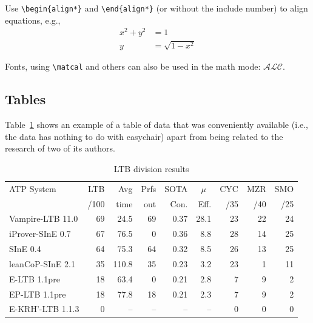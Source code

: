 \documentclass{imav2013}
\newcommand{\easychair}{\textsf{easychair}}
\begin{document}
Use {\tt \verb|\|begin\{align*\}} and {\tt \verb|\|end\{align*\}} (or without
the {\tt *} include number) to align equations, e.g.,
\begin{align*}
x^2 + y^2 &= 1 \\
y &= \sqrt{1 - x^2}
\end{align*}

Fonts, using \verb|\matcal| and others can also be used in the math mode: $\mathcal{ALC}$.

\subsection{Tables}
\label{sect:tables}

Table~\ref{tab:ltbexample} shows an example of a table of data that was
conveniently available (i.e., the data has nothing to do with
{\easychair}) apart from being related to the research of two of its
authors. 

\begin{table}[htp]
	\begin{centering}
		\begin{tabular}{lrrrrrrrr}
		\hline
		ATP System            & LTB & Avg  &Prfs & SOTA & \multicolumn{1}{c}{$\mu$} & CYC & MZR & SMO \\
		                      & /100& time & out & Con. & Eff. & /35 & /40 & /25 \\
		\hline
		Vampire-LTB 11.0      &  69 & 24.5 &  69 & 0.37 & 28.1 &  23 &  22 &  24 \\
		iProver-SInE 0.7      &  67 & 76.5 &   0 & 0.36 &  8.8 &  28 &  14 &  25 \\
		SInE 0.4              &  64 & 75.3 &  64 & 0.32 &  8.5 &  26 &  13 &  25 \\
		leanCoP-SInE 2.1      &  35 &110.8 &  35 & 0.23 &  3.2 &  23 &   1 &  11 \\
		E-LTB 1.1pre          &  18 & 63.4 &   0 & 0.21 &  2.8 &   7 &   9 &   2 \\
		EP-LTB 1.1pre         &  18 & 77.8 &  18 & 0.21 &  2.3 &   7 &   9 &   2 \\
		E-KRH'-LTB 1.1.3      &   0 &   -- &  -- &   -- &   -- &   0 &   0 &   0 \\
		\hline
		\end{tabular}
		\caption{LTB division results}
		\label{tab:ltbexample}
	\end{centering}
\end{table}
\end{document}
